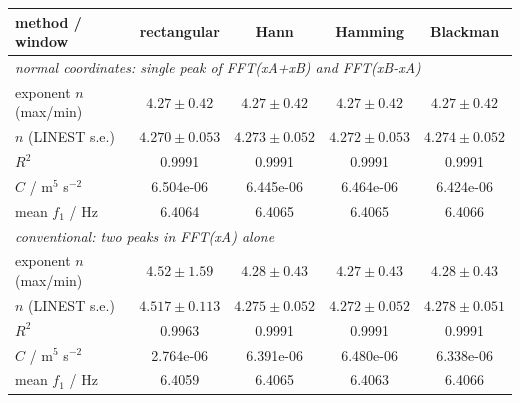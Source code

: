 \begin{tabular}{@{}lcccc@{}}
\toprule
method / window & rectangular & Hann & Hamming & Blackman \\
\midrule
\multicolumn{5}{l}{\emph{normal coordinates: single peak of FFT(xA+xB) and FFT(xB-xA)}} \\
exponent $n$ (max/min) & $4.27\pm0.42$ & $4.27\pm0.42$ & $4.27\pm0.42$ & $4.27\pm0.42$ \\
$n$ (LINEST s.e.) & $4.270\pm0.053$ & $4.273\pm0.052$ & $4.272\pm0.053$ & $4.274\pm0.052$ \\
$R^2$ & 0.9991 & 0.9991 & 0.9991 & 0.9991 \\
$C$ / m$^5$ s$^{-2}$ & 6.504e-06 & 6.445e-06 & 6.464e-06 & 6.424e-06 \\
mean $f_1$ / Hz & 6.4064 & 6.4065 & 6.4065 & 6.4066 \\
\midrule
\multicolumn{5}{l}{\emph{conventional: two peaks in FFT(xA) alone}} \\
exponent $n$ (max/min) & $4.52\pm1.59$ & $4.28\pm0.43$ & $4.27\pm0.43$ & $4.28\pm0.43$ \\
$n$ (LINEST s.e.) & $4.517\pm0.113$ & $4.275\pm0.052$ & $4.272\pm0.052$ & $4.278\pm0.051$ \\
$R^2$ & 0.9963 & 0.9991 & 0.9991 & 0.9991 \\
$C$ / m$^5$ s$^{-2}$ & 2.764e-06 & 6.391e-06 & 6.480e-06 & 6.338e-06 \\
mean $f_1$ / Hz & 6.4059 & 6.4065 & 6.4063 & 6.4066 \\
\bottomrule
\end{tabular}